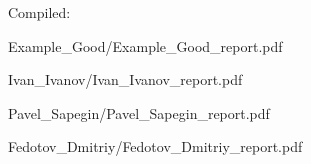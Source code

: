 \documentclass[a4paper]{article}
\begin{document}
Compiled: \DTMnow
\tableofcontents

\clearpage

{Example_Good/Example_Good_report.pdf}

{Ivan_Ivanov/Ivan_Ivanov_report.pdf}

{Pavel_Sapegin/Pavel_Sapegin_report.pdf}

{Fedotov_Dmitriy/Fedotov_Dmitriy_report.pdf}
\end{document}
